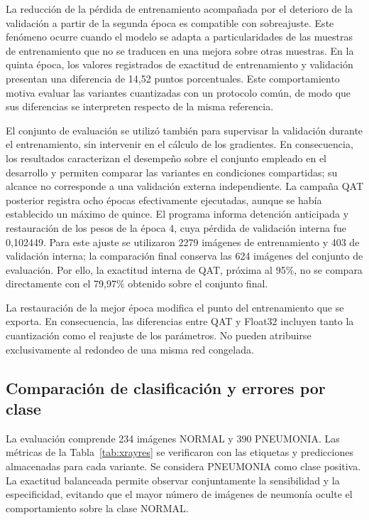 La reducción de la pérdida de entrenamiento acompañada por el deterioro de la validación a partir de la segunda época es compatible con sobreajuste. Este fenómeno ocurre cuando el modelo se adapta a particularidades de las muestras de entrenamiento que no se traducen en una mejora sobre otras muestras. En la quinta época, los valores registrados de exactitud de entrenamiento y validación presentan una diferencia de 14,52 puntos porcentuales. Este comportamiento motiva evaluar las variantes cuantizadas con un protocolo común, de modo que sus diferencias se interpreten respecto de la misma referencia.

El conjunto de evaluación se utilizó también para supervisar la validación durante el entrenamiento, sin intervenir en el cálculo de los gradientes. En consecuencia, los resultados caracterizan el desempeño sobre el conjunto empleado en el desarrollo y permiten comparar las variantes en condiciones compartidas; su alcance no corresponde a una validación externa independiente.
La campaña QAT posterior registra ocho épocas efectivamente ejecutadas, aunque se había establecido un máximo de quince. El programa informa detención anticipada y restauración de los pesos de la época 4, cuya pérdida de validación interna fue 0,102449. Para este ajuste se utilizaron 2279 imágenes de entrenamiento y 403 de validación interna; la comparación final conserva las 624 imágenes del conjunto de evaluación. Por ello, la exactitud interna de QAT, próxima al 95\%, no se compara directamente con el 79,97\% obtenido sobre el conjunto final.


La restauración de la mejor época modifica el punto del entrenamiento que se exporta. En consecuencia, las diferencias entre QAT y Float32 incluyen tanto la cuantización como el reajuste de los parámetros. No pueden atribuirse exclusivamente al redondeo de una misma red congelada.

\FloatBarrier
\subsection{Comparación de clasificación y errores por clase}
La evaluación comprende 234 imágenes NORMAL y 390 PNEUMONIA. Las métricas de la Tabla~\ref{tab:xrayres} se verificaron con las etiquetas y predicciones almacenadas para cada variante. Se considera PNEUMONIA como clase positiva. La exactitud balanceada permite observar conjuntamente la sensibilidad y la especificidad, evitando que el mayor número de imágenes de neumonía oculte el comportamiento sobre la clase NORMAL.


